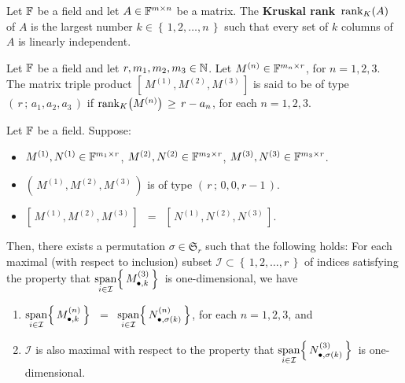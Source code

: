 \begin{definition}
\label{KruskalRank}
\mbox{}\vskip 0.1cm
\noindent
Let $\mathbb{F}$ be a field and let $A \in \mathbb{F}^{m \times n}$ be a matrix.
The \textbf{Kruskal rank} \,$\textnormal{rank}_{K}\!\left(A\right)$\, of $A$
is the largest number $k \in \left\{\,1,2,\ldots,n\,\right\}$ such that
every set of $k$ columns of $A$ is linearly independent.
\end{definition}

\begin{definition}
\label{MatrixTripleProductType}
\mbox{}\vskip 0.1cm
\noindent
Let $\mathbb{F}$ be a field and let $r, m_{1}, m_{2}, m_{3} \in \mathbb{N}$.
Let $M^{(n)} \in \mathbb{F}^{m_{n} \times r}$, for $n = 1,2,3$.
The matrix triple product $\left[\,M^{(1)},M^{(2)},M^{(3)}\,\right]$
is said to be of type $\left(\,r\,;\,a_{1},a_{2},a_{3}\,\right)$ if
$\textnormal{rank}_{K}\!\left(M^{(n)}\right) \,\geq\, r - a_{n}$, for each $n = 1,2,3$.
\end{definition}

\begin{lemma}
\mbox{}\vskip 0.1cm
\noindent
Let $\mathbb{F}$ be a field. Suppose:
\begin{itemize}
\item
	$M^{(1)}, N^{(1)} \in \mathbb{F}^{m_{1} \times r}$,\;
	$M^{(2)}, N^{(2)} \in \mathbb{F}^{m_{2} \times r}$,\;
	$M^{(3)}, N^{(3)} \in \mathbb{F}^{m_{3} \times r}$.
\item
	$\left(\,M^{(1)},M^{(2)},M^{(3)}\,\right)$ is of type $\left(\,r\,;\,0,0,r-1\,\right)$.
\item
	$\left[\,M^{(1)},M^{(2)},M^{(3)}\,\right]$
	\,$=$\,
	$\left[\,N^{(1)},N^{(2)},N^{(3)}\,\right]$.
\end{itemize}
Then, there exists a permutation $\sigma \in \mathfrak{S}_{r}$ such that the following holds:
For each maximal (with respect to inclusion) subset $\mathcal{I} \subset \left\{\,1,2,\ldots,r\,\right\}$
of indices satisfying the property that
\;$\underset{i\in\mathcal{I}}{\textnormal{span}}\!\left\{\,M^{(3)}_{\bullet,k}\,\right\}$\, is one-dimensional,
we have
\begin{enumerate}
\item
	$\underset{i\in\mathcal{I}}{\textnormal{span}}\!\left\{\,M^{(n)}_{\bullet,k}\,\right\}$ \,$=$\,
	$\underset{i\in\mathcal{I}}{\textnormal{span}}\!\left\{\,N^{(n)}_{\bullet,\sigma(k)}\,\right\}$,\;
	for each $n = 1,2,3$, and
\item
	$\mathcal{I}$ is also maximal with respect to the property that
	\;$\underset{i\in\mathcal{I}}{\textnormal{span}}\!\left\{\,N^{(3)}_{\bullet,\sigma(k)}\,\right\}$\, is one-dimensional.
\end{enumerate}
\end{lemma}
\proof

